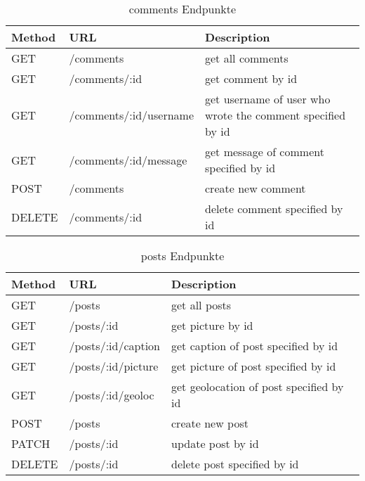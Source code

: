 \begin{table}[!htb]
    \begin{tabularx}{\textwidth}{|X|X|X|}
        \hline
        \textbf{Method} & \textbf{URL} & \textbf{Description} \\
        \hline
        \hline

    GET & /comments & get all comments\\
    \hline
    GET & /comments/:id & get comment by id\\
    \hline
    GET & /comments/:id/username & get username of user who wrote the comment specified by id\\
    \hline
    GET & /comments/:id/message & get message of comment specified by id\\
    \hline
    POST & /comments & create new comment\\
    \hline
    DELETE & /comments/:id & delete comment specified by id\\
    \hline
\end{tabularx}
\caption{comments Endpunkte}
\label{commentsendpunkte}
\end{table}

\begin{table}[!htb]
    \begin{tabularx}{\textwidth}{|X|X|X|}
        \hline
        \textbf{Method} & \textbf{URL} & \textbf{Description} \\
        \hline
        \hline
    GET & /posts & get all posts\\
    \hline
    GET & /posts/:id & get picture by id\\
    \hline
    GET & /posts/:id/caption & get caption of post specified by id\\
    \hline
    GET & /posts/:id/picture & get picture of post specified by id\\
    \hline
    GET & /posts/:id/geoloc & get geolocation of post specified by id\\
    \hline
    POST & /posts & create new post\\
    \hline
    PATCH & /posts/:id & update post by id\\
    \hline
    DELETE & /posts/:id & delete post specified by id\\
    \hline
\end{tabularx}
\caption{posts Endpunkte}
\label{postsendpunkte}
\end{table}

